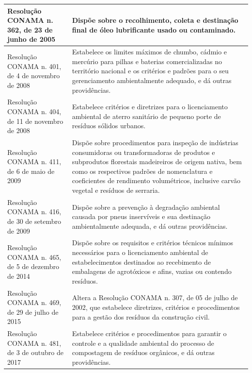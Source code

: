 \begin{center}
\begin{longtable}{|p{}|p{}|}
			\hline
			Resolução   CONAMA   n.   362, de 23 de junho de 2005 & Dispõe  sobre  o  recolhimento,  coleta  e  destinação  final  de  óleo  lubrificante usado ou contaminado. \\
			\hline
			Resolução   CONAMA   n.   401, de 4 de novembro de 2008 & Estabelece os limites máximos de chumbo, cádmio e mercúrio para pilhas e baterias comercializadas no território nacional e os critérios e padrões para o seu gerenciamento ambientalmente adequado, e dá outras providências. \\
			\hline
			Resolução   CONAMA   n.   404, de 11 de novembro de 2008 & Estabelece  critérios  e  diretrizes  para  o  licenciamento  ambiental  de  aterro sanitário de pequeno porte de resíduos sólidos urbanos. \\
			\hline
			Resolução   CONAMA   n.   411, de 6 de maio de 2009 & Dispõe  sobre  procedimentos  para  inspeção  de  indústrias  consumidoras  ou transformadoras  de produtos e subprodutos  florestais  madeireiros  de origem nativa, bem como os respectivos padrões de nomenclatura e coeficientes de rendimento volumétricos, inclusive carvão vegetal e resíduos de serraria. \\
			\hline
			Resolução   CONAMA   n.   416, de 30 de setembro de 2009 & Dispõe  sobre  a  prevenção  à  degradação  ambiental  causada  por  pneus inservíveis   e   sua   destinação   ambientalmente   adequada,   e   dá   outras providências. \\
			\hline
			Resolução   CONAMA   n.   465, de 5 de dezembro de 2014 & Dispõe  sobre  os  requisitos  e  critérios  técnicos  mínimos  necessários  para  o licenciamento  ambiental  de  estabelecimentos  destinados  ao  recebimento  de embalagens de agrotóxicos e afins, vazias ou contendo resíduos. \\
			\hline
			Resolução   CONAMA   n.   469, de 29 de julho de 2015 & Altera a Resolução CONAMA n. 307, de 05 de julho de 2002, que estabelece diretrizes, critérios e procedimentos para a gestão dos resíduos da construção civil. \\
			\hline
			Resolução   CONAMA   n.   481, de 3 de outubro de 2017 & Estabelece  critérios  e  procedimentos  para  garantir  o  controle  e  a  qualidade ambiental do processo de compostagem  de resíduos  orgânicos, e dá outras providências. \\
			\hline
			
		\end{longtable}
	\end{center}
	\renewcommand\LTcaptype{table}

